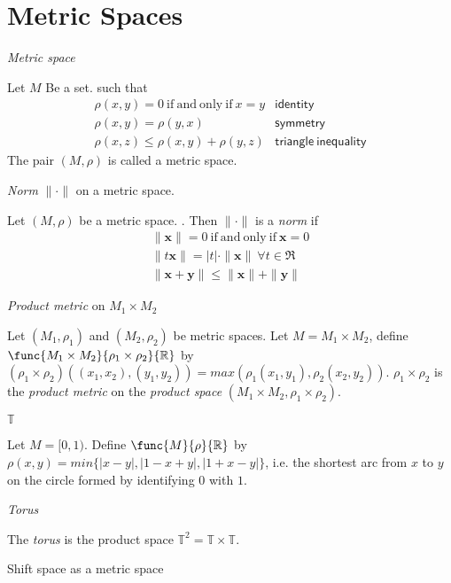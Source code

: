 \section{Metric Spaces}

\begdef
\textit{Metric space}

Let $M$ Be a set.
\letfunc{M \times M}{\rho}{[0,\infty)} such that
\begin{eqnarray*}
\rho(x,y) = 0\ \mathrm{if\ and\ only\ if}\ x = y & \mathsf{identity} \\
\rho(x,y) = \rho(y,x)                       & \mathsf{symmetry} \\
\rho(x,z) \leq \rho(x,y) + \rho(y,z)        & \mathsf{triangle\ inequality}
\end{eqnarray*}
The pair $(M,\rho)$ is called a metric space.
\edefi

\begdef
\textit{Norm} $\|\cdot\|$ on a metric space.

Let $(M,\rho)$ be a metric space.
.
Then $\|\cdot\|$ is a \textit{norm} if
\begin{eqnarray*}
\|\mathbf{x}\| = 0 \ \mathrm{if\ and\ only\ if}\ \mathbf{x} = 0 \\
\|t \mathbf{x}\| = |t| \cdot \|\mathbf{x}\|\ \forall t \in \Re  \\
\|\mathbf{x} + \mathbf{y}\| \leq \|\mathbf{x}\| + \| \mathbf{y} \|
\end{eqnarray*}
\edefi

\begdef
\textit{Product metric} on $M_1 \times M_2$

Let $(M_1, \rho_1)$ and $(M_2, \rho_2)$ be metric spaces.
Let $M = M_1 \times M_2$,
define $\func{M_1 \times M_2}{\rho_1 \times \rho_2}{\mathbb{R}}$ by
$(\rho_1 \times \rho_2)((x_1, x_2), (y_1, y_2)) = max (\rho_1(x_1,y_1), \rho_2(x_2,y_2))$.
$\rho_1 \times \rho_2$ is the \textit{product metric} on
the \textit{product space} $(M_1 \times M_2, \rho_1 \times \rho_2)$.
\edefi

\begdef
$\mathbb{T}$

Let $M = [0,1)$.
Define $\func{M}{\rho}{\mathbb{R}}$ by
$\rho(x, y) = min\{ |x-y|,|1-x+y|,|1+x-y| \}$, i.e. the shortest arc from $x$
to $y$ on the circle formed by identifying $0$ with $1$.
\edefi

\begdef
\textit{Torus}

The \textit{torus} is the product space $\mathbb{T}^2 = \mathbb{T}\times\mathbb{T}$.
\edefi

\begdef
Shift space as a metric space

